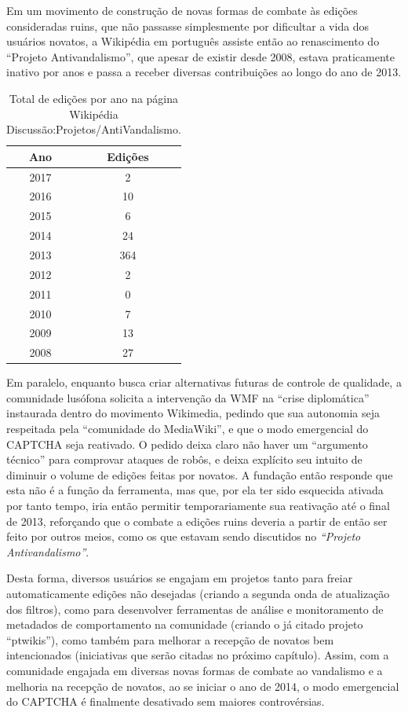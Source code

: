 Em um movimento de construção de novas formas de combate às edições consideradas ruins, que não passasse simplesmente por dificultar a vida dos usuários novatos, a Wikipédia em português assiste então ao renascimento do ``Projeto Antivandalismo'', que apesar de existir desde 2008, estava praticamente inativo por anos e passa a receber diversas contribuições ao longo do ano de 2013.

\begin{table}
\centering
\begin{tabular}{c|c}\hline
 \textbf{Ano} & \textbf{Edições}\\ \hline
    2017 & 2\\\hline
    2016 & 10\\\hline
    2015 & 6\\\hline
    2014 & 24\\\hline
    2013 & 364\\\hline
    2012 & 2\\\hline
    2011 & 0\\\hline
    2010 & 7\\\hline
    2009 & 13\\\hline
    2008 & 27\\\hline
\end{tabular}
\caption{Total de edições por ano na página Wikipédia Discussão:Projetos/AntiVandalismo.\citep{quarry_edits_page_year}}
\label{tab_edicao_wiki_antivandalismo}
\end{table}

Em paralelo, enquanto busca criar alternativas futuras de controle de qualidade,  a comunidade lusófona solicita a intervenção da WMF na ``crise diplomática'' instaurada dentro do movimento Wikimedia, pedindo que sua autonomia seja respeitada pela ``comunidade do MediaWiki'', e que o modo emergencial do CAPTCHA seja reativado. O pedido deixa claro não haver um ``argumento técnico'' para comprovar ataques de robôs, e deixa explícito seu intuito de diminuir o volume de edições feitas por novatos. A fundação então responde que esta não é a função da ferramenta, mas que, por ela ter sido esquecida ativada por tanto tempo, iria então permitir temporariamente sua reativação até o final de 2013, reforçando que o combate a edições ruins deveria a partir de então ser feito por outros meios, como os que estavam sendo discutidos no \textit{``Projeto Antivandalismo''}.  

Desta forma, diversos usuários se engajam em projetos tanto para freiar automaticamente edições não desejadas (criando a segunda onda de atualização dos filtros), como para desenvolver ferramentas de análise e monitoramento de metadados de comportamento na comunidade (criando o já citado projeto “ptwikis”), como também para melhorar a recepção de novatos bem intencionados (iniciativas que serão citadas no próximo capítulo). Assim, com a comunidade engajada em diversas novas formas de combate ao vandalismo e a melhoria na recepção de novatos, ao se iniciar o ano de 2014, o modo emergencial do CAPTCHA é finalmente desativado sem maiores controvérsias.

